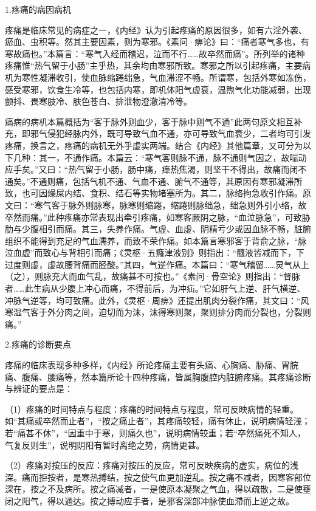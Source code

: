 \documentclass[draft,12pt]{ctexbook}
\begin{document}

1.疼痛的病因病机

疼痛是临床常见的病症之一，《内经》认为引起疼痛的原因很多，如有六淫外袭、瘀血、虫积等。然其主要因素，则为寒邪。《素问·痹论》曰：“痛者寒气多也，有寒故痛也。”本篇言：“寒气入经而稽迟，泣而不行……故卒然而痛”。所列举的诸种疼痛惟“热气留于小肠”主乎热，其余均由寒邪所致。寒邪之所以引起疼痛，主要病机为寒性凝滞收引，使血脉缩踡绌急，气血滞涩不畅。所谓寒，包括外寒如冻伤，感受寒邪，饮食生冷等，也包括内寒，即机体阳气虚衰，温煦气化功能减弱，出现颤抖、畏寒肢冷、肤色苍白、排泄物澄澈清冷等。

痛病的病机本篇概括为“客于脉外则血少，客于脉中则气不通”此两句原文相互补充，即邪气侵犯经脉内外，既可导致气血不通，亦可导致气血衰少，二者均可引发疼痛，换言之，疼痛的病机无外乎虚实两端。结合《内经》其他篇章，又可分为以下几种：其一，不通作痛。本篇云：“寒气客则脉不通，脉不通则气因之，故喘动应手矣。”又曰：“热气留于小肠，肠中痛，瘅热焦渴，则坚干不得出，故痛而闭不通矣。”不通则痛，包括气机不通、气血不通、腑气不通等，其原因有寒邪凝滞所致，也可因燥屎内结、食积、结石等实物堵塞所为。其二，脉络拘急收引作痛。原文曰：“寒气客于脉外则脉寒，脉寒则缩踡，缩踡则脉绌急，绌急则外引小络，故卒然而痛。”此种疼痛亦常表现出牵引疼痛，如寒客厥阴之脉，“血泣脉急”，可致胁肋与少腹相引而痛。其三，失养作痛。气虚、血虚、阴精亏少或因血脉不畅，脏腑组织不能得到充足的气血濡养，而致不荣作痛。如本篇言寒邪客于背俞之脉，“脉泣血虚”而致心与背相引而痛；《灵枢·五癃津液别》则指出：“髓液皆减而下，下过度则虚，虚故腰背痛而胫酸。”其四，气逆作痛。本篇曰：“寒气稽留……炅气从上（之），则脉充大而血气乱，故痛甚不可按也。”《素问·骨空论》则指出：“督脉者……此生病从少腹上冲心而痛，不得前后，为冲疝。”它如肝气上逆、肝气横逆、冲脉气逆等，均可致痛。此外，《灵枢·周痹》还提出肌肉分裂作痛，其文曰：“风寒湿气客于外分肉之间，迫切而为沫，沫得寒则聚，聚则排分肉而分裂也，分裂则痛。”

2.疼痛的诊断要点

疼痛的临床表现多种多样，《内经》所论疼痛主要有头痛、心胸痛、胁痛、胃脘痛、腹痛、腰痛等，然本篇所论十四种疼痛，皆属胸腹腔内脏腑疼痛。其疼痛诊断与辨证的要点是：

（1）疼痛的时间特点与程度：疼痛的时间特点与程度，常可反映病情的轻重。如“其痛或卒然而止者”，“按之痛止者”，其疼痛较轻，痛有休止，说明病情轻浅；若“痛甚不休”，“因重中于寒，则痛久也”，说明病情较重；若“卒然痛死不知人，气复反则生”，说明阴阳有暂时离绝之势，病情更甚。

（2）疼痛对按压的反应：疼痛对按压的反应，常可反映疾病的虚实，病位的浅深。痛而拒按者，是寒热搏结，按之使气血更加逆乱。按之痛不减者，因寒客部位深在，按之不及病所。按之痛减者，一是使原本凝聚之气血，得以疏散，二是使壅闭之阳气，得以通达。按之搏动应手者，是邪客深部冲脉使血滯而上逆之故。
\end{document}
